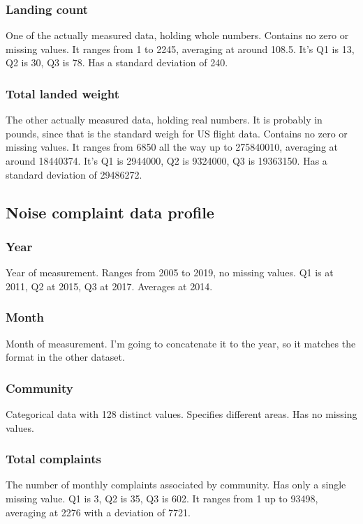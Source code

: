 \documentclass[a4paper,11pt]{article}
\begin{document}
        \subsubsection{Landing count}
        One of the actually measured data, holding whole numbers. Contains no zero or missing values. It ranges
        from 1 to 2245, averaging at around 108.5. It's Q1 is 13, Q2 is 30, Q3 is 78. Has a standard deviation of 240.
        
        \subsubsection{Total landed weight}
        The other actually measured data, holding real numbers. It is probably in pounds, since that is the standard
        weigh for US flight data. Contains no zero or missing values. It ranges from 6850 all the way up to
        275840010, averaging at around 18440374. It's Q1 is 2944000, Q2 is 9324000, Q3 is 19363150.
        Has a standard deviation of 29486272.
        
    \subsection{Noise complaint data profile}
        \subsubsection{Year}
        Year of measurement. Ranges from 2005 to 2019, no missing values. Q1 is at 2011, Q2 at 2015,
        Q3 at 2017. Averages at 2014.
        \subsubsection{Month}
        Month of measurement. I'm going to concatenate it to the year, so it matches the format in the 
        other dataset.
        \subsubsection{Community}
        Categorical data with 128 distinct values. Specifies different areas. Has no missing values.
        \subsubsection{Total complaints}
        The number of monthly complaints associated by community. Has only a single missing value.
        Q1 is 3, Q2 is 35, Q3 is 602. It ranges from 1 up to 93498, averaging at 2276 with a deviation
        of 7721.
\end{document}
